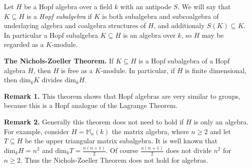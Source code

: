 \documentclass[12pt]{article}
\begin{document}
Let $H$ be a Hopf algebra over a field $k$ with an antipode $S$. We will say that $K\subseteq H$ is a \textit{Hopf subalgebra} if $K$ is both subalgebra and subcoalgebra of underlaying algebra and coalgebra structures of $H$, and additionaly $S(K)\subseteq K$. In particular a Hopf subalgebra $K\subseteq H$ is an algebra over $k$, so $H$ may be regarded as a $K$-module.

\textbf{The Nichols-Zoeller Theorem.} If $K\subseteq H$ is a Hopf subalgebra of a Hopf algebra $H$, then $H$ is free as a $K$-module. In particular, if $H$ is finite dimensional, then $\mathrm{dim}_{k}K$ divides $\mathrm{dim}_{k}H$.

\textbf{Remark 1.} This theorem shows that Hopf algebras are very similar to groups, because this is a Hopf analogue of the Lagrange Theorem.

\textbf{Remark 2.} Generally this theorem does not need to hold if $H$ is only an algebra. For example, consider $H=\mathbb{M}_{n}(k)$ the matrix algebra, where $n\geq 2$ and let $T\subseteq H$ be the upper triangular matrix subalgebra. It is well known that $\mathrm{dim}_{k}H=n^2$ and $\mathrm{dim}_{k}T=\frac{n(n+1)}{2}$. Of course $\frac{n(n+1)}{2}$ does not divide $n^2$ for $n\geq 2$. Thus the Nichols-Zoeller Theorem does not hold for algebras.
\end{document}
